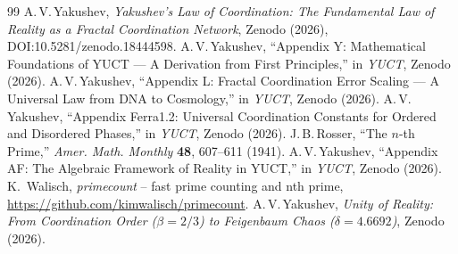 \documentclass[11pt,a4paper]{article}
\begin{document}
	\begin{thebibliography}{99}
		A.\,V.\,Yakushev, \emph{Yakushev's Law of Coordination: The Fundamental Law of Reality as a Fractal Coordination Network}, Zenodo (2026), DOI:10.5281/zenodo.18444598.
		A.\,V.\,Yakushev, ``Appendix Y: Mathematical Foundations of YUCT — A Derivation from First Principles,'' in \emph{YUCT}, Zenodo (2026).
		A.\,V.\,Yakushev, ``Appendix L: Fractal Coordination Error Scaling — A Universal Law from DNA to Cosmology,'' in \emph{YUCT}, Zenodo (2026).
		A.\,V.\,Yakushev, ``Appendix Ferra1.2: Universal Coordination Constants for Ordered and Disordered Phases,'' in \emph{YUCT}, Zenodo (2026).
		J.\,B.\,Rosser, ``The $n$-th Prime,'' \emph{Amer. Math. Monthly} \textbf{48}, 607--611 (1941).
		A.\,V.\,Yakushev, ``Appendix AF: The Algebraic Framework of Reality in YUCT,'' in \emph{YUCT}, Zenodo (2026).
		K.~Walisch, \emph{primecount} -- fast prime counting and nth prime, \url{https://github.com/kimwalisch/primecount}.
		A.\,V.\,Yakushev, \emph{Unity of Reality: From Coordination Order ($\beta=2/3$) to Feigenbaum Chaos ($\delta=4.6692$)}, Zenodo (2026).
	\end{thebibliography}
	
\end{document}
